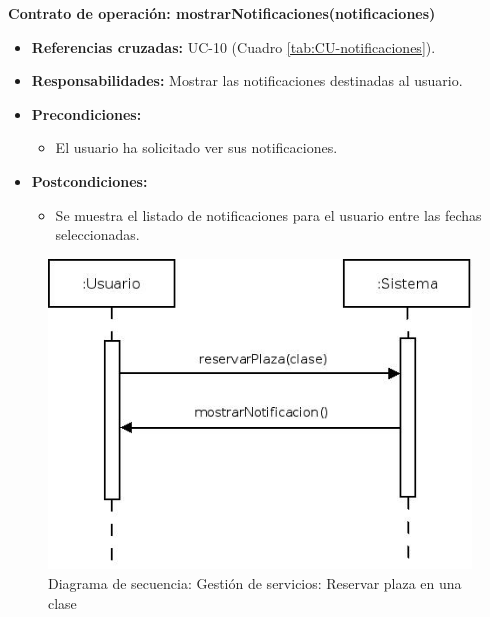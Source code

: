 \textbf{Contrato de operación: mostrarNotificaciones(notificaciones)}
\begin{itemize}
\item \textbf{Referencias cruzadas:} UC-10 (Cuadro \ref{tab:CU-notificaciones}).
\item \textbf{Responsabilidades:} Mostrar las notificaciones destinadas al usuario.
\item \textbf{Precondiciones:} 
 \begin{itemize}
\item El usuario ha solicitado ver sus notificaciones.
\end {itemize}
\item \textbf{Postcondiciones:} 
 \begin{itemize}
\item Se muestra el listado de notificaciones para el usuario entre las fechas seleccionadas.
\end {itemize}
\end {itemize}


\vspace{10mm}

\begin{figure}[H]
\centering
  \includegraphics[scale=.55]{img/secuencias/gestion-servicios-reservar-clase.jpeg}
  \caption{Diagrama de secuencia: Gestión de servicios: Reservar plaza en una clase}
  \label{fig:secuencia-gestion-servicios-reservar-clase}
\end{figure}

